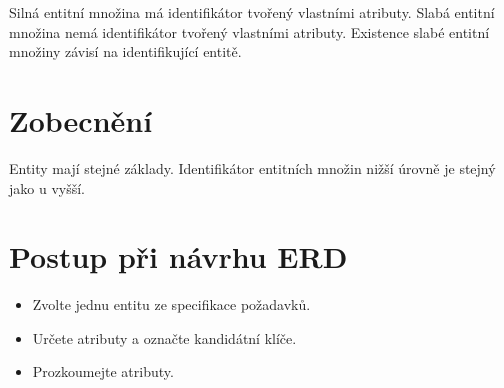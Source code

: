 \documentclass{article}
\begin{document}
Silná entitní množina má identifikátor tvořený vlastními atributy.
Slabá entitní množina nemá identifikátor tvořený vlastními atributy.
Existence slabé entitní množiny závisí na identifikující entitě.

\section{Zobecnění}

Entity mají stejné základy.
Identifikátor entitních množin nižší úrovně je stejný jako u vyšší.

\section{Postup při návrhu ERD}

\begin{itemize}
    \item Zvolte jednu entitu ze specifikace požadavků.
    \item Určete atributy a označte kandidátní klíče.
    \item Prozkoumejte atributy.
\end{itemize}
\end{document}
